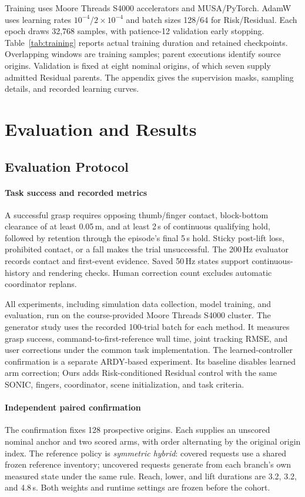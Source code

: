 \documentclass[letterpaper,10pt,conference]{ieeeconf}
\begin{document}
Training uses Moore Threads S4000 accelerators and MUSA/PyTorch. AdamW~\cite{adamw} uses learning rates $10^{-4}$/$2\times10^{-4}$ and batch sizes 128/64 for Risk/Residual. Each epoch draws 32,768 samples, with patience-12 validation early stopping. Table~\ref{tab:training} reports actual training duration and retained checkpoints. Overlapping windows are training samples; parent executions identify source origins. Validation is fixed at eight nominal origins, of which seven supply admitted Residual parents. The appendix gives the supervision masks, sampling details, and recorded learning curves.

\section{Evaluation and Results}
\subsection{Evaluation Protocol}
\paragraph{Task success and recorded metrics}
A successful grasp requires opposing thumb/finger contact, block-bottom clearance of at least 0.05\,m, and at least 2\,s of continuous qualifying hold, followed by retention through the episode's final 5\,s hold. Sticky post-lift loss, prohibited contact, or a fall makes the trial unsuccessful. The 200\,Hz evaluator records contact and first-event evidence. Saved 50\,Hz states support continuous-history and rendering checks. Human correction count excludes automatic coordinator replans.

All experiments, including simulation data collection, model training, and evaluation, run on the course-provided Moore Threads S4000 cluster. The generator study uses the recorded 100-trial batch for each method. It measures grasp success, command-to-first-reference wall time, joint tracking RMSE, and user corrections under the common task implementation. The learned-controller confirmation is a separate ARDY-based experiment. Its baseline disables learned arm correction; Ours adds Risk-conditioned Residual control with the same SONIC, fingers, coordinator, scene initialization, and task criteria.

\paragraph{Independent paired confirmation}
The confirmation fixes 128 prospective origins. Each supplies an unscored nominal anchor and two scored arms, with order alternating by the original origin index. The reference policy is \emph{symmetric hybrid}: covered requests use a shared frozen reference inventory; uncovered requests generate from each branch's own measured state under the same rule. Reach, lower, and lift durations are 3.2, 3.2, and 4.8\,s. Both weights and runtime settings are frozen before the cohort.
\end{document}
